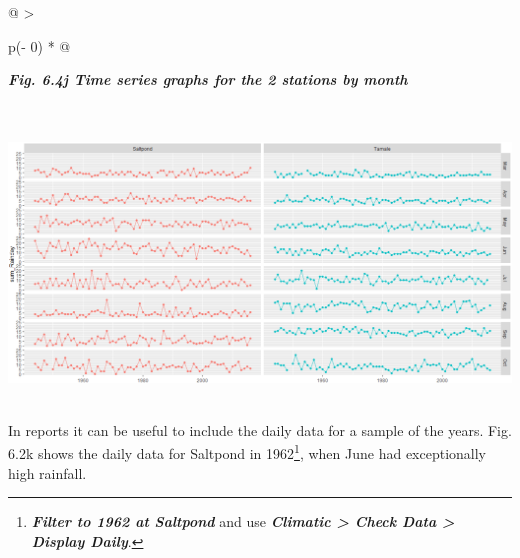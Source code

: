 \documentclass[
  letterpaper,
  DIV=11,
  numbers=noendperiod]{scrreprt}
\begin{document}
\begin{longtable}[]{@{}
  >{\raggedright\arraybackslash}p{(\columnwidth - 0\tabcolsep) * }@{}}
\toprule\noalign{}
\begin{minipage}[b]{\linewidth}\raggedright
\textbf{\emph{Fig. 6.4j Time series graphs for the 2 stations by month}}
\end{minipage} \\
\midrule\noalign{}
\endhead
\bottomrule\noalign{}
\endlastfoot
\includegraphics[width=6.06782in,height=2.90349in]{figures/Fig6.4j.png} \\
\end{longtable}

In reports it can be useful to include the daily data for a sample of
the years. Fig. 6.2k shows the daily data for Saltpond in
1962\footnote{\textbf{\emph{Filter to 1962 at Saltpond}} and use
  \textbf{\emph{Climatic \textgreater{} Check Data \textgreater{}
  Display Daily}}.}, when June had exceptionally high rainfall.
\end{document}
